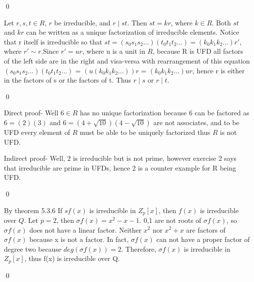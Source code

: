 \documentclass[11pt]{article}
\begin{document}
\qed


\proof
{
Let \(r,s,t \in R \), \(r\) be irreducible, and \(r\mid st\). Then \(st = kr\), where \(k \in R\). Both \(st\) and \(kr\) can be written as a unique factorization of irreducible elements. Notice that r itself is irreducible so that \(st = (s_0s_1s_2...)(t_0t_1t_2...)= (k_0k_1k_2...)r'\), where \(r'\sim r\).Since \(r' = ur\), where u is a unit in \(R\), because R is UFD all factors of the left side are in the right and visa-versa  with rearrangement of this equation \((s_0s_1s_2...)(t_0t_1t_2...)\) = \((u(k_0k_1k_2...))r\) = \((k_0k_1k_2...)ur\), hence r is either in the factors of s or the factors of t. Thus \(r\mid s \) or \(r\mid t\).
}

\qed


\proof
{
    Direct proof- Well \(6\in R\) has no unique factorization because 6 can be factored as \(6 = (2)(3)\) and \(6 =  (4+\sqrt{10})(4-\sqrt{10})\) are not associates, and to be UFD every element of \(R\) must be able to be uniquely factorized thus \(R\) is not UFD.
    
    Indirect proof- Well, 2 is irreducible but is not prime, however exercise 2 says that irreducible are prime in UFDs, hence 2 is a counter example for R being UFD.
    
}
\qed


\proof
{
    By theorem 5.3.6 If \(s f(x)\) is irreducible in \(Z_p[x]\), then \(f(x)\) is irreducible over \(Q\). Let \(p = 2\), then \(\sigma f(x)= x^2-x-1\). 0,1 are not roots of \(\sigma f(x)\), so \(\sigma f(x)\) does not have a linear factor. Neither \(x^2\) nor \(x^2+x\) are factors of \(\sigma f(x)\) because x is not a factor. In fact, \(\sigma f(x)\) can not have a proper factor of degree two because \(deg(\sigma f(x)) = 2\). Therefore, \(\sigma f(x)\) is irreducible in \(Z_p[x]\), thus f(x) is irreducible over Q. 
}

\qed
\end{document}
